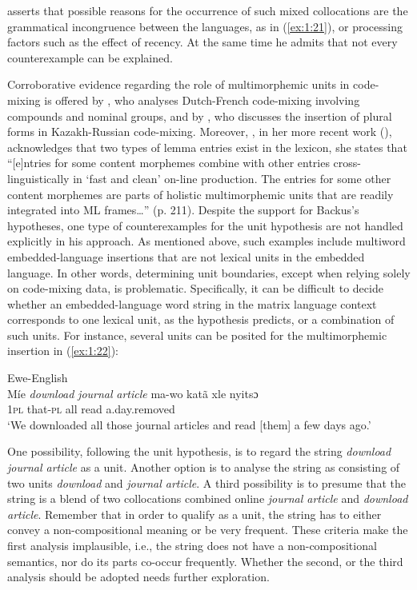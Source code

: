 \noindent \citet[113]{backus-units-2003} asserts that possible reasons for the occurrence of such mixed collocations are the grammatical incongruence between the languages, as in (\ref{ex:1:21}), or processing factors such as the effect of recency. At the same time he admits that not every counterexample can be explained.

Corroborative evidence regarding the role of multimorphemic units in code-mixing is offered by \citet{treffers-daller-2005}, who analyses Dutch-French code-mixing involving compounds and nominal groups, and by \citet[67]{muhamedowa-untersuchung-2006}, who discusses the insertion of plural forms in Kazakh-Russian code-mixing. Moreover, \citeauthor{myers-scotton-2006}, in her more recent work (\citeyear{myers-scotton-2006}), acknowledges that two types of lemma entries exist in the lexicon, she states that ``[e]ntries for some content morphemes combine with other entries cross-linguistically in `fast and clean' on-line production. The entries for some other content morphemes are parts of holistic multimorphemic units that are readily integrated into ML frames\dots'' (p. 211). Despite the support for Backus's hypotheses, one type of counterexamples for the unit hypothesis are not handled explicitly in his approach. As mentioned above, such examples include multiword embedded-language insertions that are not lexical units in the embedded language. In other words, determining unit boundaries, except when relying solely on code-mixing data, is problematic. Specifically, it can be difficult to decide whether an embedded-language word string in the matrix language context corresponds to one lexical unit, as the hypothesis predicts, or a combination of such units. For instance, several units can be posited for the multimorphemic insertion in (\ref{ex:1:22}): 

\ea{}\label{ex:1:22}
Ewe-English \citep[22]{amuzu-2013}\\
\gll Míe \textit{download} \textit{journal} \textit{article} ma-wo katã xle nyitsɔ\\
1\textsc{pl} {} {} {} that-\textsc{pl} all read a.day.removed\\
\glt `We downloaded all those journal articles and read [them] a few days ago.'
\z

\noindent One possibility, following the unit hypothesis, is to regard the string \textit{download journal article} as a unit. Another option is to analyse the string as consisting of two units \textit{download} and \textit{journal article}. A third possibility is to presume that the string is a blend of two collocations combined online \textit{journal article} and \textit{download article}. Remember that in order to qualify as a unit, the string has to either convey a non-compositional meaning or be very frequent. These criteria make the first analysis implausible, i.e., the string does not have a non-compositional semantics, nor do its parts co-occur frequently. Whether the second, or the third analysis should be adopted needs further exploration.

